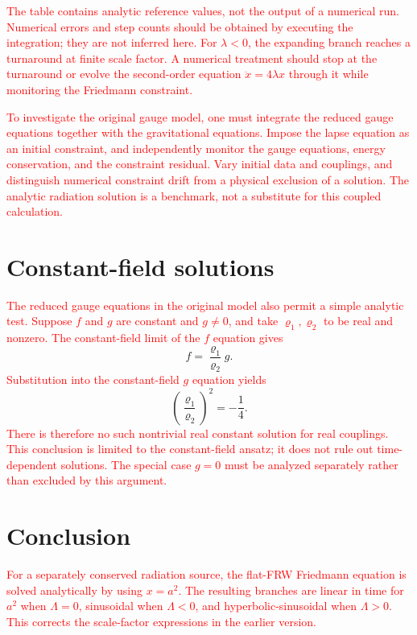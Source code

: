 \documentclass[prd,reprint,eqsecnum,nofootinbib]{revtex4-1}
\newcommand{\science}[1]{\textcolor{red}{#1}}
\begin{document}
\science{The table contains analytic reference values, not the output of a numerical run. Numerical errors and step counts should be obtained by executing the integration; they are not inferred here. For $\lambda<0$, the expanding branch reaches a turnaround at finite scale factor. A numerical treatment should stop at the turnaround or evolve the second-order equation $\ddot{x}=4\lambda x$ through it while monitoring the Friedmann constraint.}

\science{To investigate the original gauge model, one must integrate the reduced gauge equations together with the gravitational equations. Impose the lapse equation as an initial constraint, and independently monitor the gauge equations, energy conservation, and the constraint residual. Vary initial data and couplings, and distinguish numerical constraint drift from a physical exclusion of a solution. The analytic radiation solution is a benchmark, not a substitute for this coupled calculation.}

\section{Constant-field solutions}

\science{The reduced gauge equations in the original model also permit a simple analytic test. Suppose $f$ and $g$ are constant and $g\neq0$, and take $\varrho_1,\varrho_2$ to be real and nonzero. The constant-field limit of the $f$ equation gives}
\begin{equation}
  f=\frac{\varrho_1}{\varrho_2}g.
\end{equation}
\science{Substitution into the constant-field $g$ equation yields}
\begin{equation}
  \left(\frac{\varrho_1}{\varrho_2}\right)^2=-\frac14.
\end{equation}
\science{There is therefore no such nontrivial real constant solution for real couplings. This conclusion is limited to the constant-field ansatz; it does not rule out time-dependent solutions. The special case $g=0$ must be analyzed separately rather than excluded by this argument.}

\section{Conclusion}

\science{For a separately conserved radiation source, the flat-FRW Friedmann equation is solved analytically by using $x=a^2$. The resulting branches are linear in time for $a^2$ when $\Lambda=0$, sinusoidal when $\Lambda<0$, and hyperbolic-sinusoidal when $\Lambda>0$. This corrects the scale-factor expressions in the earlier version.}
\end{document}
